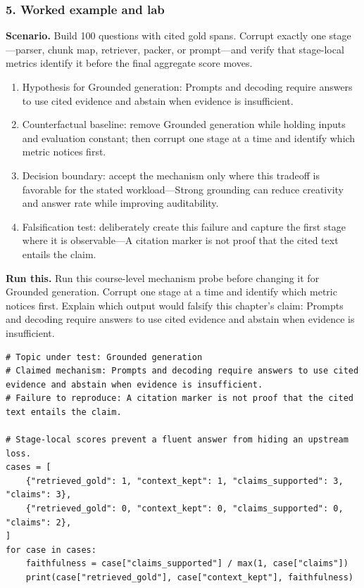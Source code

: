 \subsubsection*{5. Worked example and lab}
\textbf{Scenario.} Build 100 questions with cited gold spans. Corrupt exactly one stage—parser, chunk map, retriever, packer, or prompt—and verify that stage-local metrics identify it before the final aggregate score moves.
\begin{enumerate}
\item Hypothesis for Grounded generation: Prompts and decoding require answers to use cited evidence and abstain when evidence is insufficient.
\item Counterfactual baseline: remove Grounded generation while holding inputs and evaluation constant; then corrupt one stage at a time and identify which metric notices first.
\item Decision boundary: accept the mechanism only where this tradeoff is favorable for the stated workload—Strong grounding can reduce creativity and answer rate while improving auditability.
\item Falsification test: deliberately create this failure and capture the first stage where it is observable—A citation marker is not proof that the cited text entails the claim.
\end{enumerate}
\textbf{Run this.} Run this course-level mechanism probe before changing it for Grounded generation. Corrupt one stage at a time and identify which metric notices first. Explain which output would falsify this chapter's claim: Prompts and decoding require answers to use cited evidence and abstain when evidence is insufficient.
\begin{Verbatim}[fontsize=\scriptsize]
# Topic under test: Grounded generation
# Claimed mechanism: Prompts and decoding require answers to use cited evidence and abstain when evidence is insufficient.
# Failure to reproduce: A citation marker is not proof that the cited text entails the claim.

# Stage-local scores prevent a fluent answer from hiding an upstream loss.
cases = [
    {"retrieved_gold": 1, "context_kept": 1, "claims_supported": 3, "claims": 3},
    {"retrieved_gold": 0, "context_kept": 0, "claims_supported": 0, "claims": 2},
]
for case in cases:
    faithfulness = case["claims_supported"] / max(1, case["claims"])
    print(case["retrieved_gold"], case["context_kept"], faithfulness)
\end{Verbatim}
